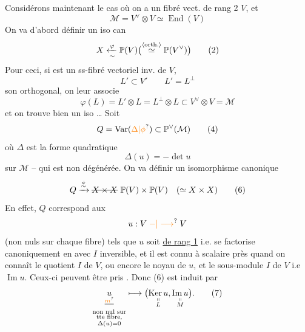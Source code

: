 Considérons maintenant le cas où on a un fibré vect. de rang 2 $V$, et 
\[
 \mathcal M=V^\vee\otimes V\simeq\operatorname{End}(V)\tag*{(1)}
\]
On va d'abord définir un iso can
\[
 X\xleftarrow[\sim]{\varphi}\mathbb P(V)
 \bigl(\overset{\inserted{\text{orth.}}}{\simeq}\mathbb P(V^\vee)\bigr)\tag*{(2)}
\]
Pour ceci, si  est un ss-fibré vectoriel inv. de $V$, 
\[
 L'\subset V'\qquad L'=L^\perp
\]
son orthogonal, on leur associe
\[
 \varphi(L)=L'\otimes L=L^\perp\otimes L\subset V^\vee\otimes V=\mathcal M\tag*{(3)}
\]
et on trouve bien un iso \ldots
Soit
\[
 Q=\operatorname{Var}(\unsure{\Delta|\phi})\subset\mathbb P^\vee(\mathcal M)\tag*{(4)}
\]
où $\Delta$ est la forme quadratique
\[
 \Delta(u)=-\det u\tag*{(5)}
\]
sur $\mathcal M$ -- qui est non dégénérée. On va définir un isomorphisme canonique
\[
 Q\xrightarrow{\overset{\psi}{\sim}}\deleted{X\times X}\ \mathbb P(V)\times\mathbb P(V)\quad(\simeq X\times X)\tag*{(6)}
\]
En effet, $Q$ correspond aux  
\[
 u:V\mathrel{\unsure{-|\longrightarrow}}V
\]
(non nuls sur chaque fibre) tels que $u$ soit \uline{ de rang 1} i.e. se factorise canoniquement en
avec $I$ inversible, et il est connu à  scalaire près quand on connaît le quotient $I$ de $V$,  ou encore le noyau de $u$, et  le sous-module $I$ de $V$ i.e $\operatorname{Im}u$. Ceux-ci peuvent être pris . Donc (6) est induit par
\[
 \underset{\substack{\deleted{\unsure{m}}\\\text{non nul sur}\\\text{tte fibre,}\\\Delta(u)=0}}{u}
 \longmapsto\bigl(\underset{\substack{\shortparallel\\L}}{\operatorname{Ker}u},
 \underset{\substack{\shortparallel\\M}}{\operatorname{Im}u}\bigr).\tag*{(7)}
\]
